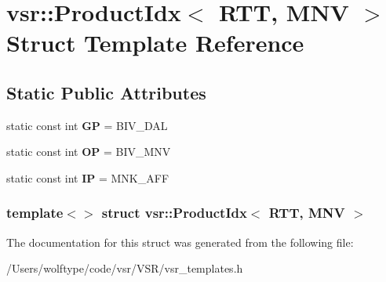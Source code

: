 \hypertarget{structvsr_1_1_product_idx_3_01_r_t_t_00_01_m_n_v_01_4}{\section{vsr\-:\-:Product\-Idx$<$ R\-T\-T, M\-N\-V $>$ Struct Template Reference}
\label{structvsr_1_1_product_idx_3_01_r_t_t_00_01_m_n_v_01_4}
}
\subsection*{Static Public Attributes}
\begin{DoxyCompactItemize}
\item 
\hypertarget{structvsr_1_1_product_idx_3_01_r_t_t_00_01_m_n_v_01_4_a9e5371b86d34016d56280729169a399d}{static const int {\bfseries G\-P} = B\-I\-V\-\_\-\-D\-A\-L}\label{structvsr_1_1_product_idx_3_01_r_t_t_00_01_m_n_v_01_4_a9e5371b86d34016d56280729169a399d}

\item 
\hypertarget{structvsr_1_1_product_idx_3_01_r_t_t_00_01_m_n_v_01_4_a527fe70e8f806b3271c200d9c363ebec}{static const int {\bfseries O\-P} = B\-I\-V\-\_\-\-M\-N\-V}\label{structvsr_1_1_product_idx_3_01_r_t_t_00_01_m_n_v_01_4_a527fe70e8f806b3271c200d9c363ebec}

\item 
\hypertarget{structvsr_1_1_product_idx_3_01_r_t_t_00_01_m_n_v_01_4_ad4a0b2b23b1e5f966590ab84d6e3c86c}{static const int {\bfseries I\-P} = M\-N\-K\-\_\-\-A\-F\-F}\label{structvsr_1_1_product_idx_3_01_r_t_t_00_01_m_n_v_01_4_ad4a0b2b23b1e5f966590ab84d6e3c86c}

\end{DoxyCompactItemize}
\subsubsection*{template$<$$>$ struct vsr\-::\-Product\-Idx$<$ R\-T\-T, M\-N\-V $>$}



The documentation for this struct was generated from the following file\-:\begin{DoxyCompactItemize}
\item 
/\-Users/wolftype/code/vsr/\-V\-S\-R/vsr\-\_\-templates.\-h\end{DoxyCompactItemize}
